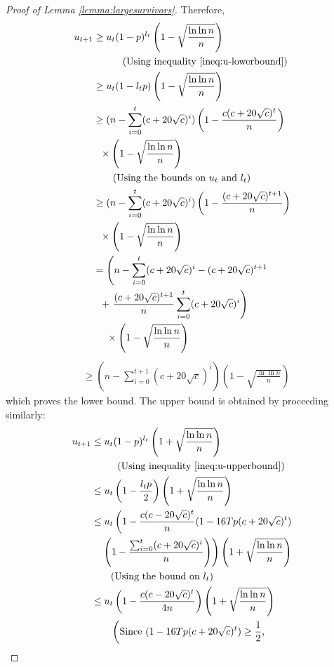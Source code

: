 \documentclass[11pt]{article}
\begin{document}
\begin{proof}[Proof of Lemma \ref{lemma:largesurvivors}]
Therefore, \begin{align*}
u_{t+1} &\geq u_t(1-p)^{l_t}\left(1-\sqrt{\frac{\ln{\ln{n}}}{n}}\right)\\
&\ \ \ \quad \quad \text{(Using inequality \ref{ineq:u-lowerbound})}\\
&\geq u_t(1-l_tp)\left(1-\sqrt{\frac{\ln{\ln{n}}}{n}}\right)\\
&\geq (n-\sum_{i=0}^t (c+20\sqrt{c})^i)\left(1-\frac{c(c+20\sqrt{c})^t}{n}\right)\\
&\ \ \times \left(1-\sqrt{\frac{\ln{\ln{n}}}{n}}\right)\\
&\quad \quad \text{(Using the bounds on $u_t$ and $l_t$)}\\
&\geq (n-\sum_{i=0}^t (c+20\sqrt{c})^i)\left(1-\frac{(c+20\sqrt{c})^{t+1}}{n}\right)\\
&\ \ \times \left(1-\sqrt{\frac{\ln{\ln{n}}}{n}}\right)\\
&= \left(n-\sum_{i=0}^t (c+20\sqrt{c})^i - (c+20\sqrt{c})^{t+1}\right. \\
&\ \ + \left.\frac{(c+20\sqrt{c})^{t+1}}{n}\sum_{i=0}^t (c+20\sqrt{c})^i\right)\\
&\ \ \ \ \times \left(1-\sqrt{\frac{\ln{\ln{n}}}{n}}\right)
\end{align*}
\begin{align*}
&\geq \left(n- \sum_{i=0}^{t+1} (c+20\sqrt{c})^i\right)\left(1-\sqrt{\frac{\ln{\ln{n}}}{n}}\right)
\end{align*}
which proves the lower bound. The upper bound is obtained by proceeding similarly:
\begin{align*}
u_{t+1} &\leq u_t(1-p)^{l_t}\left(1+\sqrt{\frac{\ln{\ln{n}}}{n}}\right) \\
& \ \ \quad \quad \text{(Using inequality \ref{ineq:u-upperbound})}\\
&\leq u_t\left(1-\frac{l_tp}{2}\right)\left(1+\sqrt{\frac{\ln{\ln{n}}}{n}}\right)\\
&\leq u_t\left(1-\frac{c(c-20\sqrt{c})^t}{n}(1-16Tp(c+20\sqrt{c})^t)\right.\\
&\ \ \ \left.\left(1-\frac{\sum_{i=0}^t(c+20\sqrt{c})^i}{n}\right)\right)\left(1+\sqrt{\frac{\ln{\ln{n}}}{n}}\right)\\
&\quad \quad \text{(Using the bound on $l_t$)}\\
&\leq u_t\left(1-\frac{c(c-20\sqrt{c})^t}{4n}\right)\left(1+\sqrt{\frac{\ln{\ln{n}}}{n}}\right) \\
& \quad \quad \left(\text{Since $(1-16Tp(c+20\sqrt{c})^t)\geq \frac{1}{2}$,}\right.\\

\end{align*}
\end{proof}
\end{document}
